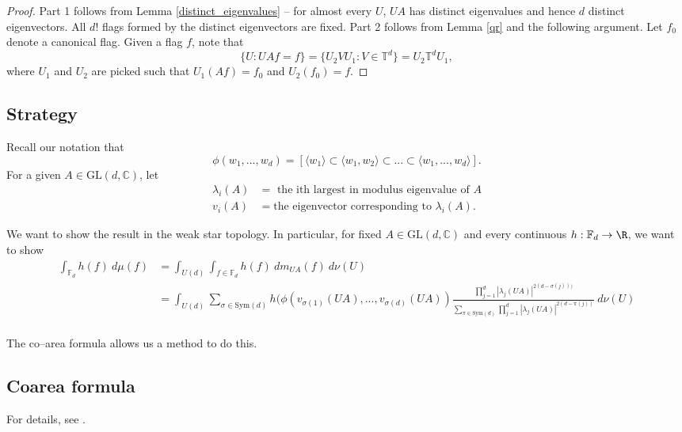 \documentclass[10pt]{amsart}
\numberwithin{equation}{section}     %
\newcommand{\C}{\mathbb{C}}
\newcommand{\T}{\mathbb{T}}
\newcommand{\Sym}{\mathrm{Sym}}
\newcommand{\FF}{\mathbb{F}}
\newcommand{\GL}{\mathrm{GL}}
\begin{document}
\begin{proof}
    Part 1 follows from Lemma  \ref{distinct_eigenvalues} -- for almost every $U$, $UA$ has distinct eigenvalues and hence $d$ distinct eigenvectors. All $d!$ flags formed by the distinct eigenvectors are fixed. Part 2 follows from Lemma \ref{qr} and the following argument.  Let $f_0$ denote a canonical flag. Given a flag $f$, note that $$\{U:UAf = f\} = \{U_2VU_1:V \in \T^d\} = U_2\T^d U_1, $$ where $U_1$ and $U_2$ are picked such that $U_1(Af) = f_0$ and $U_2(f_0) =f.$
\end{proof} 

\subsection{Strategy} \label{discussion}

 Recall our notation that $$\phi(w_1,...,w_d) = [\langle w_1 \rangle \subset \langle w_1, w_2 \rangle  \subset ... \subset \langle w_1, ..., w_d \rangle].$$ For a given $A \in \GL(d,\C)$, let 
\begin{align*}
\lambda_i(A) &= \text{ the ith largest in modulus eigenvalue of } A\\
v_i(A) &= \text{the eigenvector corresponding to } \lambda_i(A).
\end{align*}

 We want to show the result in the weak star topology. In particular, for fixed $A \in \GL(d,\C)$ and every continuous $h:\FF_d \to \R$, we want to show \begin{align*}
     \int_{\FF_d} h(f) \ d\mu(f) 
  &= \int_{U(d)} \int_{f \in \FF_d }h(f) \ dm_{UA}(f) \ d\nu(U) \\ 
  &= \int_{U(d)} \sum_{\sigma \in \Sym(d)}  h(\phi(v_{\sigma(1)}(UA),...,v_{\sigma(d)}(UA)) \frac{\prod \limits_{j = 1}^d |\lambda_j(UA)|
 ^{2(d - \sigma(j)))}}{\sum \limits_{\pi \in \Sym(d)} \prod \limits_{j=1}^d |\lambda_j(UA)|^{2(d - \pi(j))}} \ d\nu(U) \\ 
 \end{align*}

 The co--area formula allows us a method to do this. 
\subsection{Coarea formula}

For details, see \cite{evans2018measure}.
 
\end{document}
